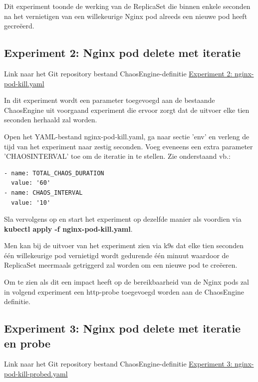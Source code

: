 Dit experiment toonde de werking van de ReplicaSet die binnen enkele seconden na het vernietigen van een willekeurige Nginx pod alreeds een nieuwe pod heeft gecreëerd.

\subsection{Experiment 2: Nginx pod delete met iteratie}

Link naar het Git repository bestand ChaosEngine-definitie \href{https://github.com/KenBruggeman/BP_21-22/blob/master/bachelorproef/docs/litmus%20experimenten/nginx-pod-kill.yaml}{Experiment 2: nginx-pod-kill.yaml}

In dit experiment wordt een parameter toegevoegd aan de bestaande ChaosEngine uit voorgaand experiment die ervoor zorgt dat de uitvoer elke tien seconden herhaald zal worden. 

Open het YAML-bestand nginx-pod-kill.yaml, ga naar sectie 'env' en verleng de tijd van het experiment naar zestig seconden. Voeg eveneens een extra parameter 'CHAOS\textunderscore INTERVAL' toe om de iteratie in te stellen. Zie onderstaand vb.:
\begin{lstlisting}
- name: TOTAL_CHAOS_DURATION
  value: '60'
- name: CHAOS_INTERVAL
  value: '10'
\end{lstlisting}

Sla vervolgens op en start het experiment op dezelfde manier als voordien via {\bf kubectl apply -f nginx-pod-kill.yaml}. 

Men kan bij de uitvoer van het experiment zien via k9s dat elke tien seconden één willekeurige pod vernietigd wordt gedurende één minuut waardoor de ReplicaSet meermaals getriggerd zal worden om een nieuwe pod te creëeren.

Om te zien als dit een impact heeft op de bereikbaarheid van de Nginx pods zal in volgend experiment een http-probe toegevoegd worden aan de ChaosEngine definitie. 

\subsection{Experiment 3: Nginx pod delete met iteratie en probe}

Link naar het Git repository bestand ChaosEngine-definitie \href{https://github.com/KenBruggeman/BP\textunderscore 21-22/blob/master/bachelorproef/docs/litmus%20experimenten/nginx-pod-kill-probed.yaml}{Experiment  3: nginx-pod-kill-probed.yaml}

